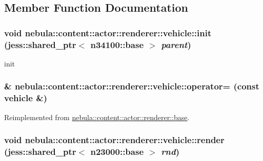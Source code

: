 \subsection{Member Function Documentation}
\hypertarget{classnebula_1_1content_1_1actor_1_1renderer_1_1vehicle_a4edb84c14eb64936d48502fe1868aca4}{
\subsubsection[{init}]{\setlength{\rightskip}{0pt plus 5cm}void nebula::content::actor::renderer::vehicle::init (jess::shared\_\-ptr$<$ {\bf n34100::base} $>$ {\em parent})}}
\label{classnebula_1_1content_1_1actor_1_1renderer_1_1vehicle_a4edb84c14eb64936d48502fe1868aca4}


init \hypertarget{classnebula_1_1content_1_1actor_1_1renderer_1_1vehicle_a3687fe4866ea01c7f21356c2f7739493}{
\subsubsection[{operator=}]{\& nebula::content::actor::renderer::vehicle::operator= (const {\bf vehicle} \&)}}
\label{classnebula_1_1content_1_1actor_1_1renderer_1_1vehicle_a3687fe4866ea01c7f21356c2f7739493}


Reimplemented from \hyperlink{classnebula_1_1content_1_1actor_1_1renderer_1_1base_a8cb55e87ac866ad14c7e1d03077681a9}{nebula::content::actor::renderer::base}.\hypertarget{classnebula_1_1content_1_1actor_1_1renderer_1_1vehicle_a363a20d1687d1a498b19960fb0bb2ee5}{
\subsubsection[{render}]{\setlength{\rightskip}{0pt plus 5cm}void nebula::content::actor::renderer::vehicle::render (jess::shared\_\-ptr$<$ {\bf n23000::base} $>$ {\em rnd})}}
\label{classnebula_1_1content_1_1actor_1_1renderer_1_1vehicle_a363a20d1687d1a498b19960fb0bb2ee5}


